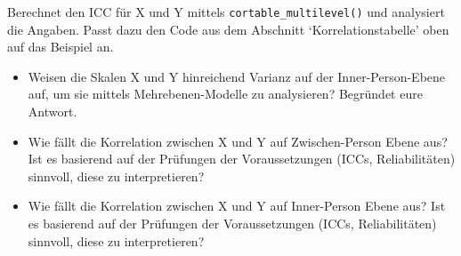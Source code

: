 \documentclass[
  letterpaper,
  DIV=11,
  numbers=noendperiod]{scrreprt}
\providecommand{\tightlist}{%
  \setlength{\itemsep}{0pt}\setlength{\parskip}{0pt}}\usepackage{longtable,booktabs,array}
\begin{document}
Berechnet den ICC für X und Y mittels \texttt{cortable\_multilevel()}
und analysiert die Angaben. Passt dazu den Code aus dem Abschnitt
`Korrelationstabelle' oben auf das Beispiel an.

\begin{itemize}
\tightlist
\item
  Weisen die Skalen X und Y hinreichend Varianz auf der
  Inner-Person-Ebene auf, um sie mittels Mehrebenen-Modelle zu
  analysieren? Begründet eure Antwort.
\item
  Wie fällt die Korrelation zwischen X und Y auf Zwischen-Person Ebene
  aus? Ist es basierend auf der Prüfungen der Voraussetzungen (ICCs,
  Reliabilitäten) sinnvoll, diese zu interpretieren?
\item
  Wie fällt die Korrelation zwischen X und Y auf Inner-Person Ebene aus?
  Ist es basierend auf der Prüfungen der Voraussetzungen (ICCs,
  Reliabilitäten) sinnvoll, diese zu interpretieren?
\end{itemize}
\end{document}
